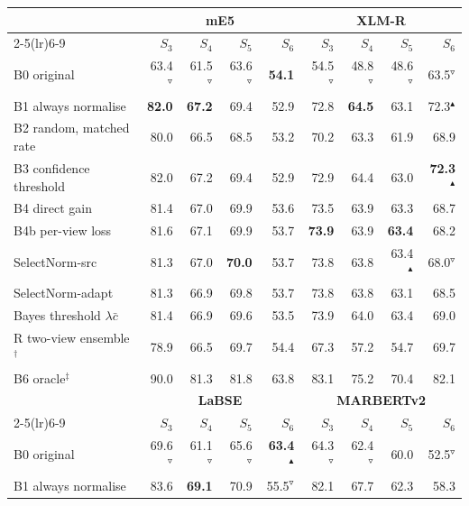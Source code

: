 \begin{tabular}{@{}lrrrrrrrr@{}}\toprule
 & \multicolumn{4}{c}{\textbf{mE5}} & \multicolumn{4}{c}{\textbf{XLM-R}}\\
\cmidrule(lr){2-5}\cmidrule(lr){6-9}
 & $S_3$ & $S_4$ & $S_5$ & $S_6$ & $S_3$ & $S_4$ & $S_5$ & $S_6$\\\midrule
B0 original & 63.4$^{\triangledown}$ & 61.5$^{\triangledown}$ & 63.6$^{\triangledown}$ & \textbf{54.1} & 54.5$^{\triangledown}$ & 48.8$^{\triangledown}$ & 48.6$^{\triangledown}$ & 63.5$^{\triangledown}$\\
B1 always normalise & \textbf{82.0} & \textbf{67.2} & 69.4 & 52.9 & 72.8 & \textbf{64.5} & 63.1 & 72.3$^{\blacktriangle}$\\
B2 random, matched rate & 80.0 & 66.5 & 68.5 & 53.2 & 70.2 & 63.3 & 61.9 & 68.9\\
B3 confidence threshold & 82.0 & 67.2 & 69.4 & 52.9 & 72.9 & 64.4 & 63.0 & \textbf{72.3}$^{\blacktriangle}$\\
B4 direct gain & 81.4 & 67.0 & 69.9 & 53.6 & 73.5 & 63.9 & 63.3 & 68.7\\
B4b per-view loss & 81.6 & 67.1 & 69.9 & 53.7 & \textbf{73.9} & 63.9 & \textbf{63.4} & 68.2\\
SelectNorm-src & 81.3 & 67.0 & \textbf{70.0} & 53.7 & 73.8 & 63.8 & 63.4$^{\blacktriangle}$ & 68.0$^{\triangledown}$\\
\rowcolor{black!6}SelectNorm-adapt & 81.3 & 66.9 & 69.8 & 53.7 & 73.8 & 63.8 & 63.1 & 68.5\\
\quad Bayes threshold $\lambda\bar c$ & 81.4 & 66.9 & 69.6 & 53.5 & 73.9 & 64.0 & 63.4 & 69.0\\
\addlinespace[2pt]
R two-view ensemble$^\dagger$ & 78.9 & 66.5 & 69.7 & 54.4 & 67.3 & 57.2 & 54.7 & 69.7\\
B6 oracle$^\ddagger$ & 90.0 & 81.3 & 81.8 & 63.8 & 83.1 & 75.2 & 70.4 & 82.1\\
\midrule[\heavyrulewidth]
 & \multicolumn{4}{c}{\textbf{LaBSE}} & \multicolumn{4}{c}{\textbf{MARBERTv2}}\\
\cmidrule(lr){2-5}\cmidrule(lr){6-9}
 & $S_3$ & $S_4$ & $S_5$ & $S_6$ & $S_3$ & $S_4$ & $S_5$ & $S_6$\\\midrule
B0 original & 69.6$^{\triangledown}$ & 61.1$^{\triangledown}$ & 65.6$^{\triangledown}$ & \textbf{63.4}$^{\blacktriangle}$ & 64.3$^{\triangledown}$ & 62.4$^{\triangledown}$ & 60.0 & 52.5$^{\triangledown}$\\
B1 always normalise & 83.6 & \textbf{69.1} & 70.9 & 55.5$^{\triangledown}$ & 82.1 & 67.7 & 62.3 & 58.3\\

\end{tabular}
